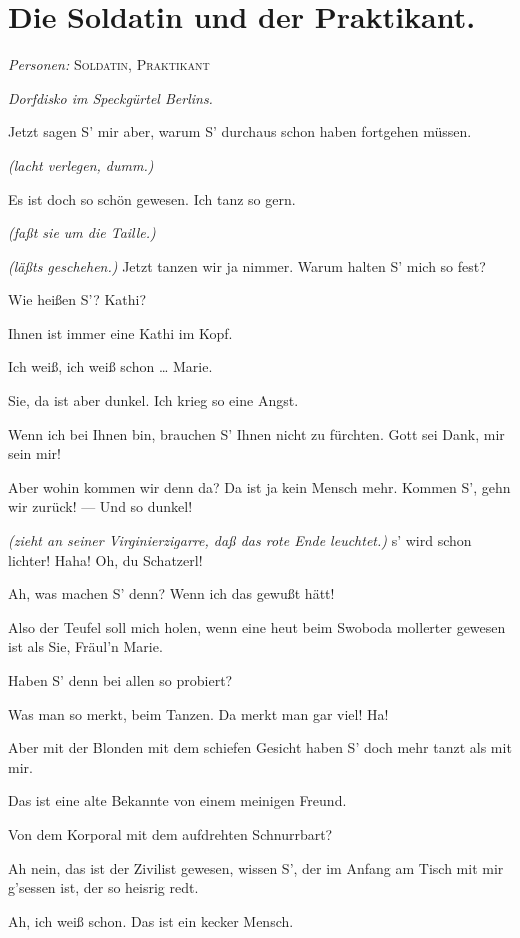 \documentclass[
	final,
	a4paper,
	ngerman,
	mpinclude = true, %
	twoside = true,
	open = right,
	cleardoublepage = plain,
	DIV = 13,
	BCOR = 1cm,
	titlepage = firstiscover,
	]{scrbook}
\newcommand{\scene}{\section}
\newcommand{\direction}[1]{\textit{(#1)}}
\newcommand{\setting}[1]{\vspace{-0.5\baselineskip}\centering\textit{#1}}
\newcommand{\characterlist}[1]{{\begin{center}\textit{Personen:} #1\end{center}}}
\newcommand{\thecharacter}[1]{\textup{\textsc{#1}}\xspace}
\newcommand{\thesoldat}{\thecharacter{Soldatin}}
\newcommand{\themaedchen}{\thecharacter{Praktikant}}
\newcommand{\character}[1]{\item[#1:]}
\newcommand{\soldat}{\character{\thesoldat}}
\newcommand{\maedchen}{\character{\themaedchen}}
\begin{document}
\scene{Die Soldatin und der Praktikant.}
\characterlist{\thesoldat, \themaedchen}
\setting{Dorfdisko im Speckgürtel Berlins.}
\begin{play}


	\maedchen
	Jetzt sagen S' mir aber, warum S' durchaus schon haben fortgehen müssen.

	\soldat
	\direction{lacht verlegen, dumm.}

	\maedchen
	Es ist doch so schön gewesen. Ich tanz so gern.

	\soldat
	\direction{faßt sie um die Taille.}

	\maedchen
	\direction{läßts geschehen.} Jetzt tanzen wir ja nimmer. Warum halten S' mich so fest?

	\soldat
	Wie heißen S'? Kathi?

	\maedchen
	Ihnen ist immer eine Kathi im Kopf.

	\soldat
	Ich weiß, ich weiß schon \ldots{} Marie.

	\maedchen
	Sie, da ist aber dunkel. Ich krieg so eine Angst.

	\soldat
	Wenn ich bei Ihnen bin, brauchen S' Ihnen nicht zu fürchten. Gott sei Dank, mir sein mir!

	\maedchen
	Aber wohin kommen wir denn da? Da ist ja kein Mensch mehr. Kommen S', gehn wir zurück! --- Und so dunkel!

	\soldat
	\direction{zieht an seiner Virginierzigarre, daß das rote Ende leuchtet.} s' wird schon lichter! Haha! Oh, du Schatzerl!

	\maedchen
	Ah, was machen S' denn? Wenn ich das gewußt hätt!

	\soldat
	Also der Teufel soll mich holen, wenn eine heut beim Swoboda mollerter gewesen ist als Sie, Fräul'n Marie.

	\maedchen
	Haben S' denn bei allen so probiert?

	\soldat
	Was man so merkt, beim Tanzen. Da merkt man gar viel! Ha!

	\maedchen
	Aber mit der Blonden mit dem schiefen Gesicht haben S' doch mehr tanzt als mit mir.

	\soldat
	Das ist eine alte Bekannte von einem meinigen Freund.

	\maedchen
	Von dem Korporal mit dem aufdrehten Schnurrbart?

	\soldat
	Ah nein, das ist der Zivilist gewesen, wissen S', der im Anfang am Tisch mit mir g'sessen ist, der so heisrig redt.

	\maedchen
	Ah, ich weiß schon. Das ist ein kecker Mensch.


\end{play}
\end{document}
